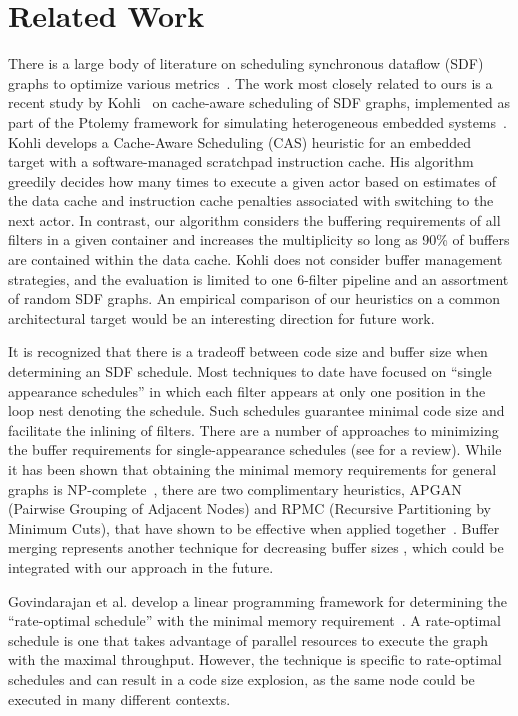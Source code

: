 \section{Related Work}
\label{sec:related-work}

There is a large body of literature on scheduling synchronous dataflow
(SDF) graphs to optimize various
metrics~\cite{bhattacharyya99synthesis,leesdf}.  The work most closely
related to ours is a recent study by Kohli~\cite{kohli04} on
cache-aware scheduling of SDF graphs, implemented as part of the
Ptolemy framework for simulating heterogeneous embedded
systems~\cite{ptolemy03overview}.  Kohli develops a Cache-Aware
Scheduling (CAS) heuristic for an embedded target with a
software-managed scratchpad instruction cache.  His algorithm greedily
decides how many times to execute a given actor based on estimates of
the data cache and instruction cache penalties associated with
switching to the next actor.  In contrast, our algorithm considers the
buffering requirements of all filters in a given container and
increases the multiplicity so long as 90\% of buffers are contained
within the data cache.  Kohli does not consider buffer management
strategies, and the evaluation is limited to one 6-filter pipeline and
an assortment of random SDF graphs.  An empirical comparison of our
heuristics on a common architectural target would be an interesting
direction for future work.

It is recognized that there is a tradeoff between code size and buffer
size when determining an SDF schedule.  Most techniques to date have
focused on ``single appearance schedules'' in which each filter
appears at only one position in the loop nest denoting the schedule.
Such schedules guarantee minimal code size and facilitate the inlining
of filters.  There are a number of approaches to minimizing the buffer
requirements for single-appearance schedules (see
\cite{bhattacharyya99synthesis} for a review).  While it has been
shown that obtaining the minimal memory requirements for general
graphs is NP-complete~\cite{Bhatta97}, there are two complimentary
heuristics, APGAN (Pairwise Grouping of Adjacent Nodes) and RPMC
(Recursive Partitioning by Minimum Cuts), that have shown to be
effective when applied together~\cite{Bhatta97}.  Buffer
merging\cite{murt1999x3,murt2000x2} represents another technique for
decreasing buffer sizes , which could be integrated with our approach
in the future.

Govindarajan et al. develop a linear programming framework for
determining the ``rate-optimal schedule'' with the minimal memory
requirement~\cite{GGD94}.  A rate-optimal schedule is one that takes
advantage of parallel resources to execute the graph with the maximal
throughput.  However, the technique is specific to rate-optimal
schedules and can result in a code size explosion, as the same node
could be executed in many different contexts.

